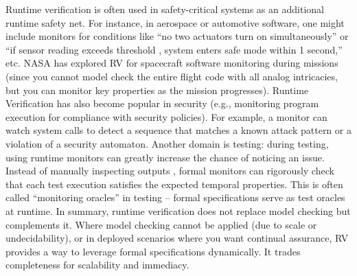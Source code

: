 Runtime verification is often used in safety-critical systems as an additional 
runtime safety net. 
For instance, in aerospace or automotive software, one might include monitors 
for conditions like “no two actuators turn on simultaneously” 
or “if sensor reading exceeds threshold , system enters safe mode
within 1 second,” etc. NASA has explored RV for spacecraft software monitoring 
during missions \cite{Slagel2024FormalRuntimeAssurance}(since you cannot model check the entire flight code with all 
analog intricacies, but you can monitor key properties as
the mission progresses). Runtime Verification has also become popular in security 
(e.g., monitoring program execution for compliance with security policies). 
For example, a monitor can watch system calls to detect a sequence that matches 
a known attack pattern or a violation of a security automaton.
Another domain is testing: during testing, using runtime monitors can greatly 
increase the chance of noticing an issue. Instead of manually inspecting outputs
, formal monitors can rigorously check that each test execution satisfies the 
expected temporal properties. This is often called “monitoring oracles” in testing
– formal specifications serve as test oracles at runtime.
In summary, runtime verification does not replace model checking but complements 
it. Where model checking cannot be applied (due to scale or undecidability), 
or in deployed scenarios where you want continual assurance, RV provides a way 
to leverage formal specifications dynamically. It trades completeness for scalability 
and immediacy.





%




